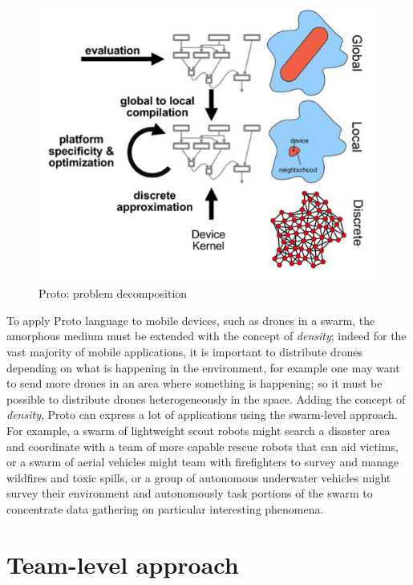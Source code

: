 \begin{figure}[h!]
  \centering
  \includegraphics[width=\linewidth]{pictures/Proto.png}
  \caption{Proto: problem decomposition}
  \label{fig:proto}
\end{figure}

To apply Proto\cite{proto} language to mobile devices, such as drones in a swarm, the amorphous medium\cite{medium} must be extended with the concept of \textit{density}; indeed for the vast majority of mobile applications, it is important to distribute drones depending on what is happening in the environment, for example one may want to send more drones in an area where something is happening; so it must be possible to distribute drones heterogeneously in the space.
Adding the concept of \textit{density}, Proto can express a lot of applications using the swarm-level approach.
For example, a swarm of lightweight scout robots might search a disaster area and coordinate with a team of more capable rescue robots that can aid victims, or a swarm of aerial vehicles might team with firefighters to survey and manage wildfires and toxic spills, or a group of autonomous underwater vehicles might survey their environment and autonomously task portions of the swarm to concentrate data gathering on particular interesting phenomena.


\section {Team-level approach}\label{teamlevel}

